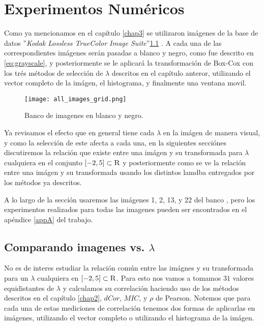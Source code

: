 \chapter{Experimentos Num\'ericos}\label{chap5}

    Como ya mencionamos en el cap\'itulo \ref{chap3} se utilizaron im\'agenes de la base de datos ''\textit{Kodak Lossless TrueColor Image Suite}''\ref{fig:rgb2gray_2} \cite{KodakLosslessTrueColorImageSuite}. A cada una de las correspondientes im\'agenes ser\'an pasadas a blanco y negro, como fue descrito en \ref{eq:grayscale}, y posteriormente se le aplicar\'a la transformaci\'on de Box-Cox con los tr\'es m\'etodos de selecci\'on de $\lambda$ descritos en el cap\'itulo anteror, utilizando el vector completo de la im\'agen, el histograma, y finalmente una ventana movil.

    \begin{figure}[H]
        \centering
        \texttt{[image: all\_images\_grid.png]}
        \caption{Banco de imagenes en blanco y negro.}
        \label{fig:rgb2gray_2}
    \end{figure}
    
    Ya revisamos el efecto que en general tiene cada $\lambda$ en la im\'agen de manera visual, y como la selecci\'on de este afecta a cada una, en la siguientes secci\'ones discutiremos la relaci\'on que existe entre una im\'agen y su transformada para $\lambda$ cualquiera en el conjunto $[-2, 5]\subset\textsc{R}$ y posteriormente como se ve la relaci\'on entre una im\'agen y su transformada usando los distintos lamdba entregados por los m\'etodos ya descritos.

    A lo largo de la secci\'on usaremos las im\'agenes 1, 2, 13, y 22 del banco \cite{KodakLosslessTrueColorImageSuite}, pero los experimentos realizados para todas las imagenes pueden ser encontrados en el ap\'endice \ref{appA} del trabajo. 
    

\section[Comparando imagenes vs. lambda]{Comparando imagenes vs. $\lambda$}

    No es de interes estudiar la relaci\'on com\'un entre las im\'agnes y su transformada para un $\lambda$ cualquiera en $[-2, 5]\subset\textsc{R}$. Para esto nos vamos a tomamos $31$ valores equidistantes de $\lambda$ y calculamos su correlaci\'on haciendo uso de los m\'etodos descritos en el cap\'itulo \ref{chap2}, $dCor$, $MIC$, y $\rho$ de Pearson. Notemos que para cada una de estas mediciones de correlaci\'on tenemos dos formas de aplicarlas en im\'agenes, utilizando el vector completo o utilizando el histograma de la im\'agen. 

